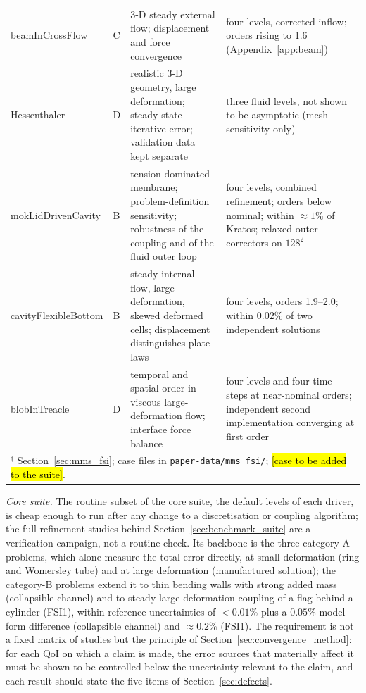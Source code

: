 \begin{table}[htbp]
\begin{tabular}{p{2.8cm}p{1.1cm}p{6.3cm}p{3.4cm}}
		beamInCrossFlow & C & 3-D steady external flow; displacement and force convergence & four levels, corrected inflow; orders rising to 1.6 (Appendix~\ref{app:beam}) \\
		Hessenthaler & D & realistic 3-D geometry, large deformation; steady-state iterative error; validation data kept separate & three fluid levels, not shown to be asymptotic (mesh sensitivity only) \\
		mokLidDrivenCavity & B & tension-dominated membrane; problem-definition sensitivity; robustness of the coupling and of the fluid outer loop & four levels, combined refinement; orders below nominal; within $\approx1\%$ of Kratos; relaxed outer correctors on $128^2$ \\
		cavityFlexibleBottom & B & steady internal flow, large deformation, skewed deformed cells; displacement distinguishes plate laws & four levels, orders 1.9--2.0; within $0.02\%$ of two independent solutions \\
		blobInTreacle & D & temporal and spatial order in viscous large-deformation flow; interface force balance & four levels and four time steps at near-nominal orders; independent second implementation converging at first order \\
		\bottomrule
		\multicolumn{4}{l}{$^\dagger$ Section~\ref{sec:mms_fsi}; case files in \texttt{paper-data/mms\_fsi/}; \hl{[case to be added to the suite]}.}
	\end{tabular}
\end{table}

\emph{Core suite.}\label{sec:core_suite}
The routine subset of the core suite, the default levels of each driver, is cheap enough to run after any change to a discretisation or coupling algorithm; the full refinement studies behind Section~\ref{sec:benchmark_suite} are a verification campaign, not a routine check.
Its backbone is the three category-A problems, which alone measure the total error directly, at small deformation (ring and Womersley tube) and at large deformation (manufactured solution); the category-B problems extend it to thin bending walls with strong added mass (collapsible channel) and to steady large-deformation coupling of a flag behind a cylinder (FSI1), within reference uncertainties of $<0.01\%$ plus a $0.05\%$ model-form difference (collapsible channel) and $\approx0.2\%$ (FSI1).
The requirement is not a fixed matrix of studies but the principle of Section~\ref{sec:convergence_method}: for each QoI on which a claim is made, the error sources that materially affect it must be shown to be controlled below the uncertainty relevant to the claim, and each result should state the five items of Section~\ref{sec:defects}.

